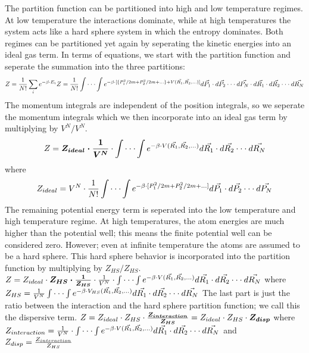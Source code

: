 The partition function can be partitioned into high and low temperature regimes. At low temperature the interactions dominate, while at high temperatures the system acts like a hard sphere system in which the entropy dominates. Both regimes can be partitioned yet again by seperating the kinetic energies into an ideal gas term. In terms of equations, we start with the partition function and seperate the summation into the three partitions:
$$\newline Z=\frac{1}{N!}\sum_i e^{-\beta\cdot E_i}
\newline Z=\frac{1}{N!}\int\cdot\cdot\cdot\int e^{-\beta\cdot [\{P_{1}^2/{2m}+P_{2}^2/{2m}+...\}+V(\vec{R_1},\vec{R_2},...)]}d\vec{P_1}\cdot d\vec{P_2}\cdot\cdot\cdot d\vec{P_N}\cdot d\vec{R_1}\cdot d\vec{R_2}\cdot\cdot\cdot d\vec{R_N}\newline$$
The momentum integrals are independent of the position integrals, so we seperate the momentum integrals which we then incorporate into an ideal gas term by multiplying by $V^N/V^N$.
$$\newline Z=\boldsymbol{Z_{ideal} \cdot \frac{1}{V^N}}\cdot \int\cdot\cdot\cdot\int e^{-\beta\cdot V(\vec{R_1},\vec{R_2},...)}d\vec{R_1}\cdot d\vec{R_2}\cdot\cdot\cdot d\vec{R_N}\newline$$
where $$Z_{ideal}=V^N\cdot\frac{1}{N!}\int\cdot\cdot\cdot\int e^{-\beta\cdot [P_{1}^2/{2m}+P_{2}^2/{2m}+...]}d\vec{P_1}\cdot d\vec{P_2}\cdot\cdot\cdot d\vec{P_N}\newline$$
The remaining potential energy term is seperated into the low temperature and high temperature regime. At high temperatures, the atom energies are much higher than the potential well; this means the finite potential well can be considered zero. However; even at infinite temperature the atoms are assumed to be a hard sphere. This hard sphere behavior is incorporated into the partition function by multiplying by $Z_{HS}/Z_{HS}$.
$\newline Z=Z_{ideal}\cdot \boldsymbol{Z_{HS}\cdot \frac{1}{Z_{HS}}}\cdot \frac{1}{V^N}\cdot \int\cdot\cdot\cdot\int e^{-\beta\cdot V(\vec{R_1},\vec{R_2},...)}d\vec{R_1}\cdot d\vec{R_2}\cdot\cdot\cdot d\vec{R_N}\newline$
where $Z_{HS}=\frac{1}{V^N}\int\cdot\cdot\cdot\int e^{-\beta\cdot V_{HS}(\vec{R_1},\vec{R_2},...)}d\vec{R_1}\cdot d\vec{R_2}\cdot\cdot\cdot d\vec{R_N}\newline$
The last part is just the ratio between the interaction and the hard sphere partition function; we call this the dispersive term.
$\newline Z=Z_{ideal}\cdot Z_{HS}\cdot \boldsymbol{\frac{Z_{interaction}}{Z_{HS}}}=Z_{ideal}\cdot Z_{HS}\cdot \boldsymbol{Z_{disp}}\newline$
where $Z_{interaction}=\frac{1}{V^N}\cdot \int\cdot\cdot\cdot\int e^{-\beta\cdot V(\vec{R_1},\vec{R_2},...)}d\vec{R_1}\cdot d\vec{R_2}\cdot\cdot\cdot d\vec{R_N}\newline$
and $Z_{disp}= \frac{Z_{interaction}}{Z_{HS}}\newline$

